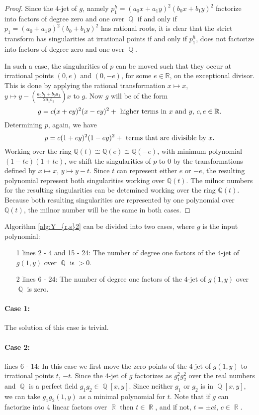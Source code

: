 \documentclass[noend]{amsproc}
\theoremstyle{definition}
\DeclareMathOperator{\Q}{\mathbb{Q}}
\DeclareMathOperator{\R}{\mathbb{R}}
\begin{document}
\begin{proof}
Since the $4$-jet of $g$, namely $p_1^h=(a_0x+a_1y)^2(b_0x+b_1y)^2$ factorize into factors of degree zero and one over $\Q$ if and only if $p_1=(a_0+a_1y)^2(b_0+b_1y)^2$ has rational roots, it is clear that the strict transform has singularities at irrational points if and only if $p_1^h$, does not factorize into factors of degree zero and one over $\Q$. 

In such a case, the singularities of $p$ can be moved such that they occur at
irrational points $(0,e)$ and $(0,-e)$, for some $e\in\mathbb R$, on the
exceptional divisor. This is done by applying the rational transformation
$x\mapsto x$, $y\mapsto y-(\frac{a_0b_1+b_0a_1}{2a_1b_1})x$ to $g$.
Now $g$ will be of the form
\[g=c(x+ey)^2(x-ey)^2+\textnormal{ higher terms in $x$ and $y$,
$c,e\in\mathbb R$}.\]
Determining $p$, again, we have
\[p=c(1+ey)^2(1-ey)^2+\textnormal{ terms that are divisible by $x$.}\]
 Working over the ring $\mathbb Q(t)\cong \mathbb Q(e)\cong \mathbb Q (-e)$,
 with minimum polynomial $(1-te)(1+te)$, we shift the singularities of $p$ to $0$
 by the transformations defined by $x\mapsto x$, $y\mapsto y-t$. Since
 $t$ can represent either $e$ or $-e$, the resulting polynomial represent both
 singularities working over $\mathbb Q(t)$. The milnor numbers for the
 resulting singularities can be detemined working over
 the ring $\mathbb Q(t)$. Because both resulting singularities are represented by
 one polynomial over $\mathbb Q(t)$, the milnor number will be the same in both
 cases.
\end{proof}

Algorithm \ref{alg:Y_{r,s}2} can be divided into two cases, where $g$ is the input polynomial:

\begin{itemize}
\item[1] lines 2 - 4 and 15 - 24:  The number of degree one factors of the $4$-jet of $g(1,y)$  over $\Q$ is $>0$.
\item[2] lines 6 - 24: The number of degree one factors of the $4$-jet of $g(1,y)$ over $\Q$ is zero.
\end{itemize}

\paragraph{Case 1:} The solution of this case is trivial.

\paragraph{Case 2:} lines 6 - 14:  In this case we first move the zero points of the $4$-jet of $g(1,y)$ to irrational points $t$, $-t$.  Since the $4$-jet of $g$ factorizes as $g_1^2g_2^2$ over the real numbers and $\Q$ is a perfect field $g_1g_2\in\Q[x,y]$. Since neither $g_1$ or $g_2$ is in $\Q[x,y]$, we can take $g_1g_2(1,y)$ as a minimal polynomial for $t$. Note that if $g$ can factorize into $4$ linear factors over $\R$ then $t\in\R$, and if not, $t=\pm ci$, $c\in\R$. 
\end{document}
